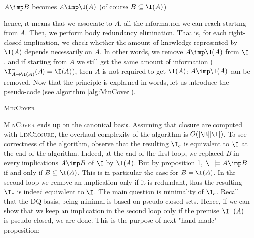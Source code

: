 \begin{center} $A \imp B$ becomes $A \imp \I(A)$ (of course $B \subseteq 
	\I(A)$)
\end{center}

\noindent hence, it means that we associate to $A$, all the information we can 
reach starting from $A$. Then, we perform body redundancy elimination. That is, 
for each right-closed implication, we check whether the amount of knowledge 
represented by $\I(A)$ depends necessarily on $A$. In other words, we remove
$A \imp \I(A)$ from $\I$, and if starting from $A$ we still get the same amount 
of information ($\I^{-}_{A \rightarrow \I(A)}(A) = \I(A)$), then
$A$ is not required to get $\I(A)$: $A \imp \I(A)$ can be removed. Now that 
the principle is explained in words, let us introduce the pseudo-code (see 
algorithm \ref{alg:MinCover}).

\vspace{1.2em}

\begin{algorithm}
	
	\BlankLine
	\BlankLine
	
	
	\BlankLine
	
	
	\caption{\textsc{MinCover}}
	\label{alg:MinCover}	
\end{algorithm}

\textsc{MinCover} ends up on the canonical basis. Assuming that 
closure are computed with \textsc{LinClosure}, the overhaul complexity of
the algorithm is $O(|\B||\I|)$. To see correctness of the algorithm, observe
that the resulting $\I_c$ is equivalent to $\I$ at the end of the algorithm.
Indeed, at the end of the first loop, we replaced $B$ in every implications $A 
\imp B$ of $\I$ by $\I(A)$. But by proposition 1, $\I \models A \imp B$ if and 
only if $B \subseteq \I(A)$. This is in particular the case for $B = \I(A)$.
In the second loop we remove an implication only if it is redundant, thus
the resulting $\I_c$ is indeed equivalent to $\I$. The main question is 
minimality of $\I_c$. Recall that the DQ-basis, being minimal is based on 
pseudo-closed sets. Hence, if we can show that we keep an implication in the 
second loop only if the premise $\I^{-}(A)$ is pseudo-closed, we are done. This
is the purpose of next "hand-made" proposition:

